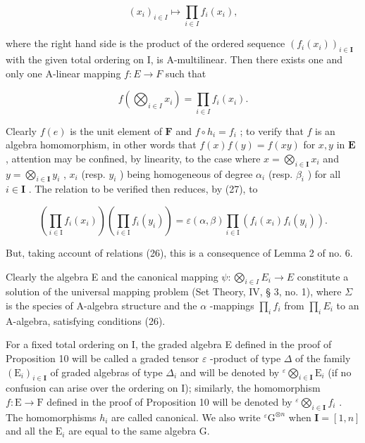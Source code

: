 \[
(x _ {i}) _ {i \in I} \mapsto \prod_ {i \in I} f _ {i} (x _ {i}),
\]

where the right hand side is the product of the ordered sequence \((f_{i}(x_{i}))_{i\in\mathbf{I}}\) with the given total ordering on I, is A-multilinear. Then there exists one and only one A-linear mapping \(f: E \rightarrow F\) such that

\[
f \left(\bigotimes_ {i \in I} x _ {i}\right) = \prod_ {i \in I} f _ {i} (x _ {i}).\tag{30}
\]

Clearly \(f(e)\) is the unit element of \(\mathbf{F}\) and \(f \circ h_i = f_i\) ; to verify that \(f\) is an algebra homomorphism, in other words that \(f(x)f(y) = f(xy)\) for \(x, y\) in \(\mathbf{E}\) , attention may be confined, by linearity, to the case where \(x = \bigotimes_{i \in \mathbf{I}} x_i\) and \(y = \bigotimes_{i \in \mathbf{I}} y_i\) , \(x_i\) (resp. \(y_i\) ) being homogeneous of degree \(\alpha_i\) (resp. \(\beta_i\) ) for all \(i \in \mathbf{I}\) . The relation to be verified then reduces, by (27), to

\[
\left(\prod_ {i \in \mathrm{I}} f _ {i} (x _ {i})\right) \left(\prod_ {i \in \mathrm{I}} f _ {i} (y _ {i})\right) = \varepsilon (\alpha , \beta) \prod_ {i \in \mathrm{I}} \left(f _ {i} (x _ {i}) f _ {i} (y _ {i})\right).
\]

But, taking account of relations (26), this is a consequence of Lemma 2 of no. 6.

Clearly the algebra E and the canonical mapping \(\psi: \bigotimes_{i \in I} E_i \to E\) constitute a solution of the universal mapping problem (Set Theory, IV, § 3, no. 1), where \(\Sigma\) is the species of A-algebra structure and the \(\alpha\) -mappings \(\prod_{i} f_i\) from \(\prod_{i} E_i\) to an A-algebra, satisfying conditions (26).

For a fixed total ordering on I, the graded algebra E defined in the proof of Proposition 10 will be called a graded tensor \(\varepsilon\) -product of type \(\Delta\) of the family \((\mathrm{E}_i)_{i\in \mathbf{I}}\) of graded algebras of type \(\Delta_i\) and will be denoted by \({}^{\varepsilon}\bigotimes_{i\in \mathbf{I}}\mathrm{E}_i\) (if no confusion can arise over the ordering on I); similarly, the homomorphism \(f:\mathrm{E}\to \mathrm{F}\) defined in the proof of Proposition 10 will be denoted by \({}^{\varepsilon}\bigotimes_{i\in \mathbf{I}}f_i\) . The homomorphisms \(h_i\) are called canonical. We also write \({}^{\varepsilon}\mathrm{G}^{\otimes n}\) when \(\mathbf{I} = [1,n]\) and all the \(\mathrm{E}_i\) are equal to the same algebra G.

